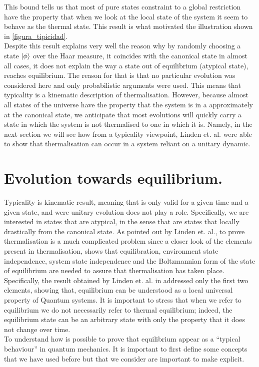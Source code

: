 This bound tells us that most of pure states constraint to a global restriction have the property that when we look at the local state of the system it seem to behave as the thermal state. This result is what motivated the illustration shown in \ref{figura_tipicidad}.\\
\indent Despite this result explains very well the reason why by randomly choosing a state $\mathinner{|{\phi}\rangle}$ over the Haar measure, it coincides with the canonical state in almost all cases, it does not explain the way a state out of equilibrium (atypical state), reaches equilibrium. The reason for that is that no particular evolution was considered here and only probabilistic arguments were used. This means that typicality is a kinematic description of thermalisation. However, because almost all states of the universe have the property that the system is in a approximately at the canonical state, we anticipate that most evolutions will quickly carry a state in which the system is not thermalised to one in which it is. Namely, in the next section we will see how from a typicality viewpoint,  Linden et. al.\cite{linden_quantum_2009} were able to show that thermalisation can occur in a system reliant on a unitary dynamic.

\section{Evolution towards equilibrium.}

Typicality is kinematic result, meaning that is only valid for a given time and a given state, and were unitary evolution does not play a role. Specifically, we are interested in states that are atypical, in the sense that are states that locally drastically from the canonical state. As pointed out by Linden et. al.\cite{linden_quantum_2009}, to prove thermalisation is a much complicated problem since a closer look of the elements present in thermalisation, shows that equilibration, environment state independence, system state independence and the Boltzmannian form of the state of equilibrium are needed to assure that thermalisation has taken place. Specifically, the result obtained by Linden et. al. in \cite{linden_quantum_2009} addressed only the first two elements, showing that, equilibrium can be understood as a local universal property of Quantum systems. It is important to stress that when we refer to equilibrium we do not necessarily refer to thermal equilibrium; indeed, the equilibrium state can be an arbitrary state with only the property that it does not change over time.\\
\indent To understand how is possible to prove that equilibrium appear as a ``typical behaviour'' in quantum mechanics. It is important to first define some concepts that we have used before but that we consider are important to make explicit.\\



